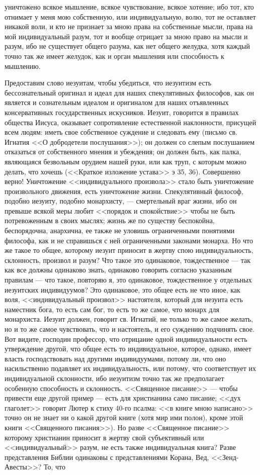 \documentclass[12pt]{article}
\begin{document}
уничтожено всякое мышление, всякое чувствование, всякое хотение; ибо тот, кто отнимает у меня мою собственную, или индивидуальную, волю, тот не оставляет никакой воли, и кто не признает за мною права на собственные мысли, права на мой индивидуальный разум, тот и вообще отрицает за мною право на мысли и разум, ибо не существует общего разума, как нет общего желудка, хотя каждый точно так же имеет желудок, как и орган мышления или способность к мышлению. 

Предоставим слово иезуитам, чтобы убедиться, что иезуитизм есть бессознательный оригинал и идеал для наших спекулятивных философов, как он является и сознательным идеалом и оригиналом для наших отъявленных консервативных государственных искусников. Иезуит, говорится в правилах общества Иисуса, оказывает сопротивление естественной наклонности, присущей всем людям: иметь свое собственное суждение и следовать ему (письмо св. Игнатия <<О добродетели послушания>>); он должен со слепым послушанием отказаться от собственного мнения и убеждения; он должен быть, как палка, являющаяся безвольным орудием нашей руки, или как труп, с которым можно делать, что хочешь (<<Краткое изложение устава>>  э 35, 36). Совершенно верно! Уничтожение <<индивидуального произвола>>  стало быть уничтожение произвольного движения, есть уничтожение жизни. Спекулятивный философ, подобно иезуиту, подобно монархисту, --- смертельный враг жизни, ибо он превыше всякой меры любит <<порядок и спокойствие>>  чтобы не быть потревоженным в своих мыслях; жизнь же по существу беспокойна, беспорядочна, анархична, ее также не уловишь ограниченными понятиями философа, как и не справишься с ней ограниченными законами монарха. Но что же такое то общее, которому иезуит приносит в жертву спою индивидуальность, склонность, произвол и разум? Что такое это одинаковое, тождественное --- так как все должны одинаково знать, одинаково говорить согласно указанным правилам --- что такое, повторяю я, это одинаковое, тождественное у отдельных иезуитских индивидуумов? Это одинаковое, это общее есть не что иное, как воля, <<индивидуальный произвол>> настоятеля, который для иезуита есть наместник бога, то есть сам бог, то есть то же самое, что монарх для монархиста. Иезуит должен, говорит св. Игнатий, не только то же самое желать, но и то же самое чувствовать, что и настоятель, и его суждению подчинять свое. Вот видите, господин профессор, что отрицание одной индивидуальности есть утверждение другой, что общее есть то индивидуальное, которое, однако, имеет власть господствовать над другими индивидуумами, потому ли, что оно насильственно подавляет их индивидуальность, или потому, что соответствует их индивидуальной склонности, ибо иезуитизм точно так же предполагает особенную способность и склонность. <<Священное писание>> --- чтобы привести еще другой пример --- есть для христианина само писание; <<дух глаголет>>  говорит Лютер к стиху 40-го псалма: <<в книге мною написано>>  точно он не знает ни о какой другой книге (хотя мир ими полон), кроме этой книги <<Священного писания>>). Но разве <<Священное писание>>  которому христианин приносит в жертву свой субъективный или <<индивидуальный>> разум, не есть также индивидуальная книга? Разве представления Библии одинаковы с представлениями Корана, Вед, <<Зенд-Авесты>>? То, что 
\end{document}
